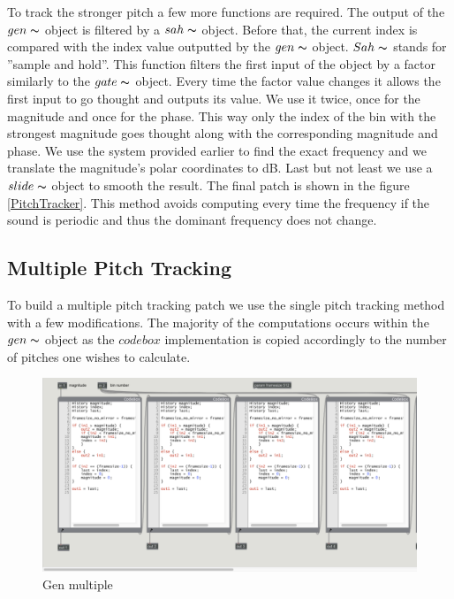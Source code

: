 To track the stronger pitch a few more functions are required. The output of the $gen\thicksim$ object is filtered by a $sah\thicksim$ object. Before that, the current index is compared with the index value outputted by the $gen\thicksim$ object. $Sah\thicksim$ stands for ''sample and hold''. This function filters the first input of the object by a factor similarly to the $gate\thicksim$ object. Every time the factor value changes it allows the first input to go thought and outputs its value. We use it twice, once for the magnitude and once for the phase. This way only the index of the bin with the strongest magnitude goes thought along with the corresponding magnitude and phase. We use the system provided earlier to find the exact frequency and we translate the magnitude's polar coordinates to dB. Last but not least we use a $slide\thicksim$ object to smooth the result. The final patch is shown in the figure \ref{PitchTracker}. This method avoids computing every time the frequency if the sound is periodic and thus the dominant frequency does not change.


\subsection{Multiple Pitch Tracking}

To build a multiple pitch tracking patch we use the single pitch tracking method with a few modifications. The majority of the computations occurs within the $gen\thicksim$ object as the $codebox$ implementation is copied accordingly to the number of pitches one wishes to calculate.

    \begin{figure}
        \centering
        \includegraphics[width = \textwidth]{Graphs/GenMultiple.png}
        \caption{Gen multiple}
        \label{GenMultiple}
    \end{figure}

